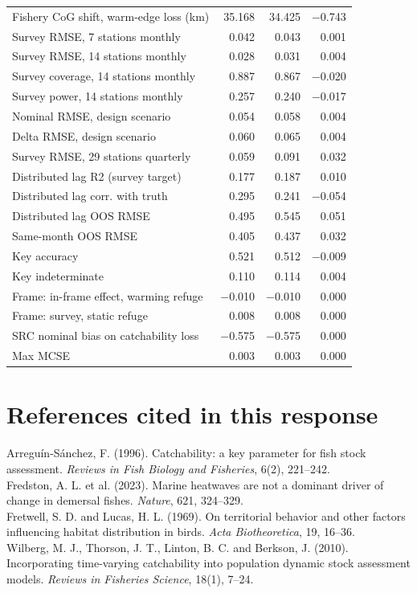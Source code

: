 \documentclass[11pt,a4paper]{article}
\begin{document}
\begin{table}[htbp]
\begin{tabular}{@{}lrrr@{}}
Fishery CoG shift, warm-edge loss (km) & 35.168 & 34.425 & $-$0.743 \\
Survey RMSE, 7 stations monthly & 0.042 & 0.043 & 0.001 \\
Survey RMSE, 14 stations monthly & 0.028 & 0.031 & 0.004 \\
Survey coverage, 14 stations monthly & 0.887 & 0.867 & $-$0.020 \\
Survey power, 14 stations monthly & 0.257 & 0.240 & $-$0.017 \\
Nominal RMSE, design scenario & 0.054 & 0.058 & 0.004 \\
Delta RMSE, design scenario & 0.060 & 0.065 & 0.004 \\
Survey RMSE, 29 stations quarterly & 0.059 & 0.091 & 0.032 \\
Distributed lag R2 (survey target) & 0.177 & 0.187 & 0.010 \\
Distributed lag corr. with truth & 0.295 & 0.241 & $-$0.054 \\
Distributed lag OOS RMSE & 0.495 & 0.545 & 0.051 \\
Same-month OOS RMSE & 0.405 & 0.437 & 0.032 \\
Key accuracy & 0.521 & 0.512 & $-$0.009 \\
Key indeterminate & 0.110 & 0.114 & 0.004 \\
Frame: in-frame effect, warming refuge & $-$0.010 & $-$0.010 & 0.000 \\
Frame: survey, static refuge & 0.008 & 0.008 & 0.000 \\
SRC nominal bias on catchability loss & $-$0.575 & $-$0.575 & 0.000 \\
Max MCSE & 0.003 & 0.003 & 0.000 \\
\bottomrule
\end{tabular}

\end{table}

\section*{References cited in this response}
Arregu\'in-S\'anchez, F. (1996). Catchability: a key parameter for fish stock assessment. \textit{Reviews in Fish Biology and Fisheries}, 6(2), 221--242.\\
Fredston, A. L. et al. (2023). Marine heatwaves are not a dominant driver of change in demersal fishes. \textit{Nature}, 621, 324--329.\\
Fretwell, S. D. and Lucas, H. L. (1969). On territorial behavior and other factors influencing habitat distribution in birds. \textit{Acta Biotheoretica}, 19, 16--36.\\
Wilberg, M. J., Thorson, J. T., Linton, B. C. and Berkson, J. (2010). Incorporating time-varying catchability into population dynamic stock assessment models. \textit{Reviews in Fisheries Science}, 18(1), 7--24.
\end{document}

